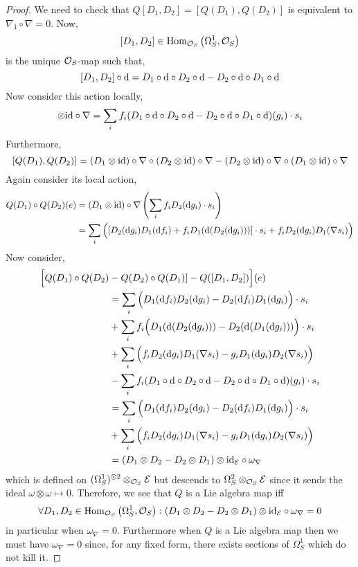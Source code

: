 \documentclass[12pt]{article}
\begin{document}
\begin{proof}
We need to check that $Q[D_1, D_2] = [Q(D_1), Q(D_2)]$ is equivalent to $\nabla_1 \circ \nabla = 0$. Now,
\[ [D_1, D_2] \in \mathrm{Hom}_{\mathcal{O}_{S}} \left( \Omega^1_S, \mathcal{O}_{S} \right) \]
is the unique $\mathcal{O}_{S}$-map such that,
\[ [D_1, D_2] \circ \mathrm{d} = D_1 \circ \mathrm{d} \circ D_2 \circ \mathrm{d} - D_2 \circ \mathrm{d} \circ D_1 \circ \mathrm{d} \]
Now consider this action locally,
\begin{align*}
[D_1, D_2] \otimes \id \circ \nabla = \sum_i f_i (D_1 \circ \d \circ D_2 \circ \d - D_2 \circ \d \circ D_1 \circ \d)(g_i) \cdot s_i 
\end{align*}
Furthermore, 
\[ [Q(D_1), Q(D_2)] = (D_1 \otimes \mathrm{id}) \circ \nabla \circ (D_2 \otimes \mathrm{id}) \circ \nabla - (D_2 \otimes \mathrm{id}) \circ \nabla \circ (D_1 \otimes \mathrm{id}) \circ \nabla \]
Again consider its local action,
\begin{align*}
Q(D_1) \circ  Q(D_2)(e) & = (D_1 \otimes \mathrm{id}) \circ \nabla \left( \sum_i f_i D_2(\mathrm{d} g_i) \cdot s_i \right) 
\\
& = \sum_i \Big( [D_2(\mathrm{d} g_i) D_1(\mathrm{d} f_i) + f_i D_1(\mathrm{d} (D_2(\mathrm{d} g_i))) ] \cdot s_i + f_i D_2(\mathrm{d} g_i) D_1( \nabla s_i ) \Big)
\end{align*}
Now consider,
\begin{align*}
\Big[ Q(D_1) \circ Q(D_2) & - Q(D_2) \circ Q(D_1)] - Q([D_1, D_2]) \Big](e)
\\
& = \sum_i \Big( D_1(\mathrm{d} f_i) D_2(\mathrm{d} g_i) - D_2(\mathrm{d} f_i) D_1(\mathrm{d} g_i)  \Big) \cdot s_i
\\
& + \sum_i f_i \Big(D_1(\mathrm{d} (D_2(\mathrm{d} g_i))) - D_2(\mathrm{d} (D_1(\mathrm{d} g_i))) \Big) \cdot s_i
\\
& +  \sum_i  \Big( f_i D_2(\mathrm{d} g_i) D_1(\nabla s_i) - g_i D_1(\mathrm{d} g_i) D_2(\nabla s_i) \Big)
\\
& - \sum_i f_i (D_1 \circ \mathrm{d} \circ D_2 \circ \mathrm{d} - D_2 \circ \mathrm{d} \circ D_1 \circ \mathrm{d} )(g_i) \cdot s_i
\\
& = \sum_i \Big( D_1(\mathrm{d} f_i) D_2(\mathrm{d} g_i) - D_2(\mathrm{d} f_i) D_1(\mathrm{d} g_i)  \Big) \cdot s_i 
\\
& +  \sum_i  \Big( f_i D_2(\mathrm{d} g_i) D_1(\nabla s_i) - g_i D_1(\mathrm{d} g_i) D_2(\nabla s_i) \Big)
\\
& = (D_1 \otimes D_2 - D_2 \otimes D_1) \otimes \mathrm{id}_{\mathcal{E}} \circ \omega_\nabla 
\end{align*}
which is defined on $(\Omega^1_S)^{\otimes 2} \otimes_{\mathcal{O}_{S}} \mathcal{E}$ but descends to $\Omega^2_S \otimes_{\mathcal{O}_{S}} \mathcal{E}$ since it sends the ideal $\omega \otimes \omega \mapsto 0$. Therefore, we see that $Q$ is a Lie algebra map iff
\[ \forall D_1, D_2 \in \mathrm{Hom}_{\mathcal{O}_{S}} \left( \Omega^1_S, \mathcal{O}_{S} \right) : (D_1 \otimes D_2 - D_2 \otimes D_1) \otimes \mathrm{id}_{\mathcal{E}} \circ \omega_\nabla = 0 \]
in particular when $\omega_\nabla = 0$. Furthermore when $Q$ is a Lie algebra map then we must have $\omega_\nabla = 0$ since, for any fixed form, there exists sections of $\Omega^1_S$ which do not kill it. 
\end{proof}
\end{document}
